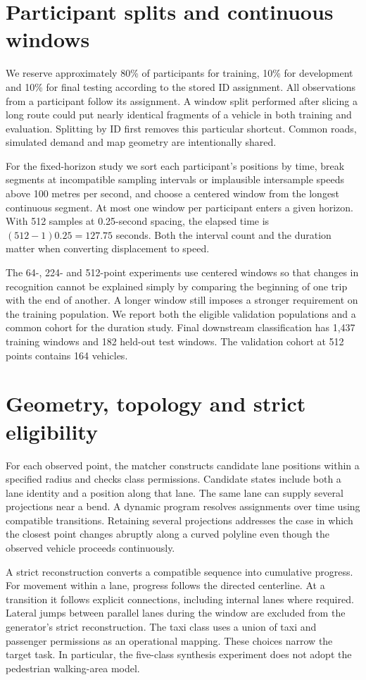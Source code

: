 \section{Participant splits and continuous windows}
We reserve approximately 80\% of participants for training, 10\% for development and 10\% for final testing according to the stored ID assignment. All observations from a participant follow its assignment. A window split performed after slicing a long route could put nearly identical fragments of a vehicle in both training and evaluation. Splitting by ID first removes this particular shortcut. Common roads, simulated demand and map geometry are intentionally shared.

For the fixed-horizon study we sort each participant's positions by time, break segments at incompatible sampling intervals or implausible intersample speeds above 100 metres per second, and choose a centered window from the longest continuous segment. At most one window per participant enters a given horizon. With 512 samples at 0.25-second spacing, the elapsed time is $(512-1)0.25=127.75$ seconds. Both the interval count and the duration matter when converting displacement to speed.

The 64-, 224- and 512-point experiments use centered windows so that changes in recognition cannot be explained simply by comparing the beginning of one trip with the end of another. A longer window still imposes a stronger requirement on the training population. We report both the eligible validation populations and a common cohort for the duration study. Final downstream classification has 1,437 training windows and 182 held-out test windows. The validation cohort at 512 points contains 164 vehicles.

\section{Geometry, topology and strict eligibility}
For each observed point, the matcher constructs candidate lane positions within a specified radius and checks class permissions. Candidate states include both a lane identity and a position along that lane. The same lane can supply several projections near a bend. A dynamic program resolves assignments over time using compatible transitions. Retaining several projections addresses the case in which the closest point changes abruptly along a curved polyline even though the observed vehicle proceeds continuously.

A strict reconstruction converts a compatible sequence into cumulative progress. For movement within a lane, progress follows the directed centerline. At a transition it follows explicit connections, including internal lanes where required. Lateral jumps between parallel lanes during the window are excluded from the generator's strict reconstruction. The taxi class uses a union of taxi and passenger permissions as an operational mapping. These choices narrow the target task. In particular, the five-class synthesis experiment does not adopt the pedestrian walking-area model.

